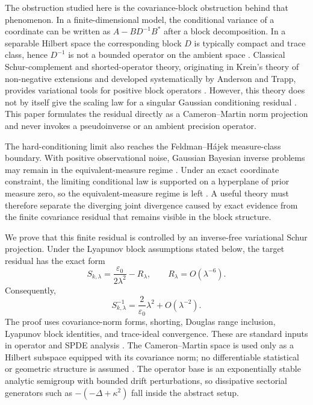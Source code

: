 \documentclass[11pt]{amsart}
\theoremstyle{plain}
\theoremstyle{definition}
\theoremstyle{remark}
\begin{document}
The obstruction studied here is the covariance-block obstruction behind that phenomenon.  In a finite-dimensional model, the conditional variance of a coordinate can be written as $A-BD^{-1}B^*$ after a block decomposition.  In a separable Hilbert space the corresponding block $D$ is typically compact and trace class, hence $D^{-1}$ is not a bounded operator on the ambient space \cite{bogachev1998gaussian,simon2005trace,daprato2014stochastic}.  Classical Schur-complement and shorted-operator theory, originating in Krein's theory of non-negative extensions and developed systematically by Anderson and Trapp, provides variational tools for positive block operators \cite{krein1947selfadjoint,anderson1975shorted,douglas1966majorization}.  However, this theory does not by itself give the scaling law for a singular Gaussian conditioning residual \cite{tretter2008spectral,contino2018schur,friedrich2017generalized,hassi2023complementation}.  This paper formulates the residual directly as a Cameron--Martin norm projection and never invokes a pseudoinverse or an ambient precision operator.

The hard-conditioning limit also reaches the Feldman--H\'{a}jek measure-class boundary.  With positive observational noise, Gaussian Bayesian inverse problems may remain in the equivalent-measure regime \cite{stuart2010inverse,carerelie2024optimal,carerelie2025posterior}.  Under an exact coordinate constraint, the limiting conditional law is supported on a hyperplane of prior measure zero, so the equivalent-measure regime is left \cite{feldman1958equivalence,hajek1958property,bogachev1998gaussian}.  A useful theory must therefore separate the diverging joint divergence caused by exact evidence from the finite covariance residual that remains visible in the block structure.

We prove that this finite residual is controlled by an inverse-free variational Schur projection.  Under the Lyapunov block assumptions stated below, the target residual has the exact form
\[
  S_{k,\lambda}=\frac{\varepsilon_0}{2\lambda^2}-R_\lambda,
  \qquad
  R_\lambda=O(\lambda^{-6}).
\]
Consequently,
\[
  S_{k,\lambda}^{-1}=\frac{2}{\varepsilon_0}\lambda^2+O(\lambda^{-2}).
\]
The proof uses covariance-norm forms, shorting, Douglas range inclusion, Lyapunov block identities, and trace-ideal convergence. These are standard inputs in operator and SPDE analysis \cite{krein1947selfadjoint,anderson1975shorted,douglas1966majorization} \cite{simon2005trace,daprato2014stochastic}. The Cameron--Martin space is used only as a Hilbert subspace equipped with its covariance norm; no differentiable statistical or geometric structure is assumed \cite{bogachev1998gaussian}.
The operator base is an exponentially stable analytic semigroup with bounded drift perturbations, so dissipative sectorial generators such as $-(-\Delta+\kappa^2)$ fall inside the abstract setup.
\end{document}
